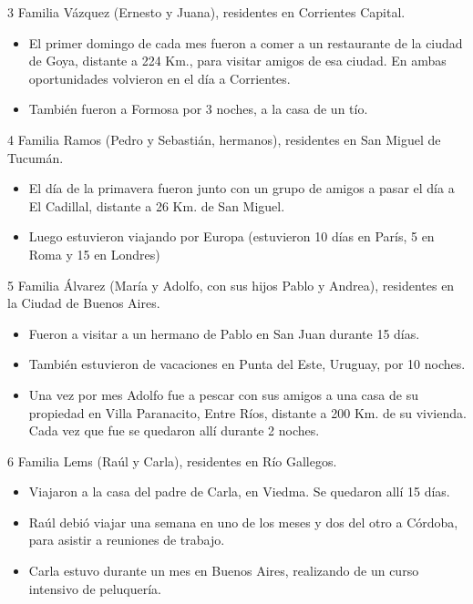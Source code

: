 \documentclass[
  openany]{book}
\begin{document}
3 Familia Vázquez (Ernesto y Juana), residentes en Corrientes Capital.

\begin{itemize}
\item
  El primer domingo de cada mes fueron a comer a un restaurante de la ciudad de Goya, distante a 224 Km., para visitar amigos de esa ciudad. En ambas oportunidades volvieron en el día a Corrientes.
\item
  También fueron a Formosa por 3 noches, a la casa de un tío.\\
\end{itemize}

4 Familia Ramos (Pedro y Sebastián, hermanos), residentes en San Miguel de Tucumán.

\begin{itemize}
\item
  El día de la primavera fueron junto con un grupo de amigos a pasar el día a El Cadillal, distante a 26 Km. de San Miguel.
\item
  Luego estuvieron viajando por Europa (estuvieron 10 días en París, 5 en Roma y 15 en Londres)
\end{itemize}

5 Familia Álvarez (María y Adolfo, con sus hijos Pablo y Andrea), residentes en la Ciudad de Buenos Aires.

\begin{itemize}
\item
  Fueron a visitar a un hermano de Pablo en San Juan durante 15 días.
\item
  También estuvieron de vacaciones en Punta del Este, Uruguay, por 10 noches.
\item
  Una vez por mes Adolfo fue a pescar con sus amigos a una casa de su propiedad en Villa Paranacito, Entre Ríos, distante a 200 Km. de su vivienda. Cada vez que fue se quedaron allí durante 2 noches.
\end{itemize}

6 Familia Lems (Raúl y Carla), residentes en Río Gallegos.

\begin{itemize}
\item
  Viajaron a la casa del padre de Carla, en Viedma. Se quedaron allí 15 días.
\item
  Raúl debió viajar una semana en uno de los meses y dos del otro a Córdoba, para asistir a reuniones de trabajo.
\item
  Carla estuvo durante un mes en Buenos Aires, realizando de un curso intensivo de peluquería.
\end{itemize}
\end{document}
